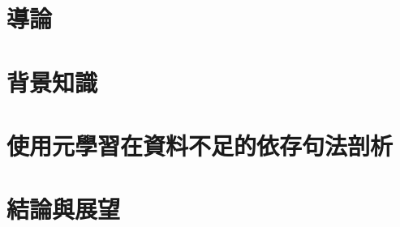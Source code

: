 \chapter{導論}
  
\chapter{背景知識}
  
\chapter{使用元學習在資料不足的依存句法剖析}
  
\iffalse
\chapter{使用\XNorm在依存句法剖析}
  
\fi
\chapter{結論與展望}
  
